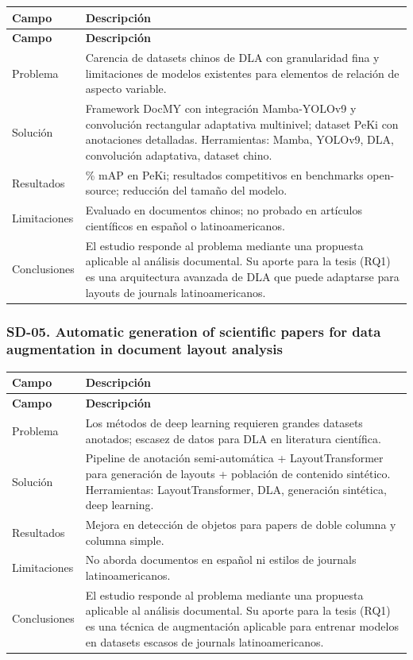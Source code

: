 \begin{longtable}{@{}>{\raggedright\arraybackslash}p{}>{\raggedright\arraybackslash}p{}@{}}
\toprule
\textbf{Campo} & \textbf{Descripción} \\
\midrule
\endfirsthead
\toprule
\textbf{Campo} & \textbf{Descripción} \\
\midrule
\endhead
\bottomrule
\endfoot
\endlastfoot
Problema & Carencia de datasets chinos de DLA con granularidad fina y limitaciones de modelos existentes para elementos de relación de aspecto variable. \\
Solución & Framework DocMY con integración Mamba-YOLOv9 y convolución rectangular adaptativa multinivel; dataset PeKi con anotaciones detalladas. Herramientas: Mamba, YOLOv9, DLA, convolución adaptativa, dataset chino. \\
Resultados & 96.5\% mAP en PeKi; resultados competitivos en benchmarks open-source; reducción del tamaño del modelo. \\
Limitaciones & Evaluado en documentos chinos; no probado en artículos científicos en español o latinoamericanos. \\
Conclusiones & El estudio responde al problema mediante una propuesta aplicable al análisis documental. Su aporte para la tesis (RQ1) es una arquitectura avanzada de DLA que puede adaptarse para layouts de journals latinoamericanos. \\
\end{longtable}

\subsubsection*{SD-05. Automatic generation of scientific papers for data augmentation in document layout analysis}

\begin{longtable}{@{}>{\raggedright\arraybackslash}p{}>{\raggedright\arraybackslash}p{}@{}}
\toprule
\textbf{Campo} & \textbf{Descripción} \\
\midrule
\endfirsthead
\toprule
\textbf{Campo} & \textbf{Descripción} \\
\midrule
\endhead
\bottomrule
\endfoot
\endlastfoot
Problema & Los métodos de deep learning requieren grandes datasets anotados; escasez de datos para DLA en literatura científica. \\
Solución & Pipeline de anotación semi-automática + LayoutTransformer para generación de layouts + población de contenido sintético. Herramientas: LayoutTransformer, DLA, generación sintética, deep learning. \\
Resultados & Mejora en detección de objetos para papers de doble columna y columna simple. \\
Limitaciones & No aborda documentos en español ni estilos de journals latinoamericanos. \\
Conclusiones & El estudio responde al problema mediante una propuesta aplicable al análisis documental. Su aporte para la tesis (RQ1) es una técnica de augmentación aplicable para entrenar modelos en datasets escasos de journals latinoamericanos. \\
\end{longtable}

